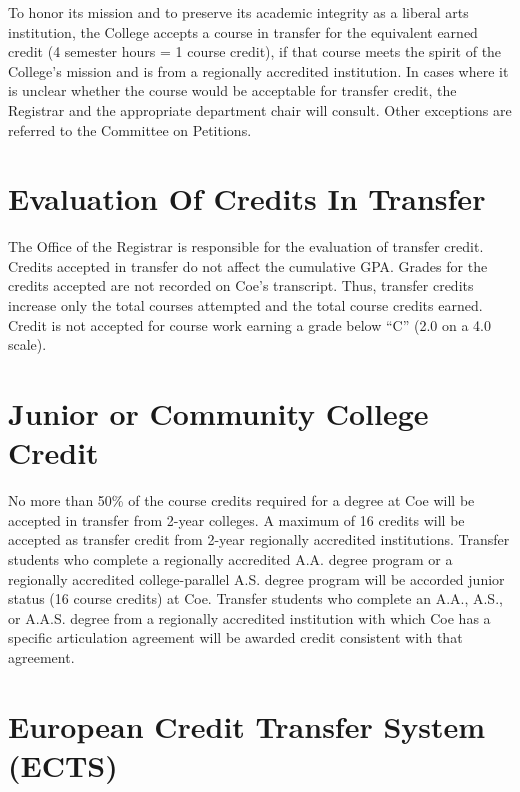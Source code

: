 \documentclass[
  letterpaper,
]{scrbook}
\begin{document}
To honor its mission and to preserve its academic integrity as a liberal
arts institution, the College accepts a course in transfer for the
equivalent earned credit (4 semester hours = 1 course credit), if that
course meets the spirit of the College's mission and is from a
regionally accredited institution. In cases where it is unclear whether
the course would be acceptable for transfer credit, the Registrar and
the appropriate department chair will consult. Other exceptions are
referred to the Committee on Petitions.

\hypertarget{evaluation-of-credits-in-transfer}{%
\section{Evaluation Of Credits In
Transfer}\label{evaluation-of-credits-in-transfer}}

The Office of the Registrar is responsible for the evaluation of
transfer credit. Credits accepted in transfer do not affect the
cumulative GPA. Grades for the credits accepted are not recorded on
Coe's transcript. Thus, transfer credits increase only the total courses
attempted and the total course credits earned. Credit is not accepted
for course work earning a grade below ``C'' (2.0 on a 4.0 scale).

\hypertarget{junior-or-community-college-credit}{%
\section{Junior or Community College
Credit}\label{junior-or-community-college-credit}}

No more than 50\% of the course credits required for a degree at Coe
will be accepted in transfer from 2-year colleges. A maximum of 16
credits will be accepted as transfer credit from 2-year regionally
accredited institutions. Transfer students who complete a regionally
accredited A.A. degree program or a regionally accredited
college-parallel A.S. degree program will be accorded junior status (16
course credits) at Coe. Transfer students who complete an A.A., A.S., or
A.A.S. degree from a regionally accredited institution with which Coe
has a specific articulation agreement will be awarded credit consistent
with that agreement.

\hypertarget{european-credit-transfer-system-ects}{%
\section{European Credit Transfer System
(ECTS)}\label{european-credit-transfer-system-ects}}
\end{document}
